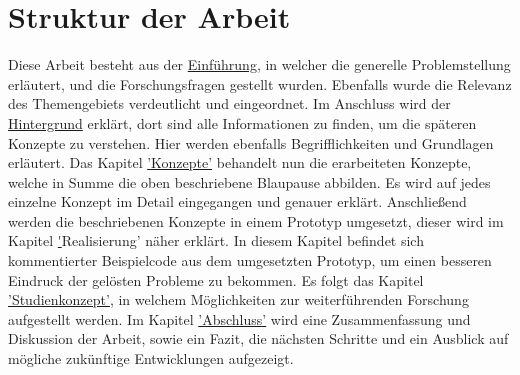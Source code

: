 \section{Struktur der Arbeit}

Diese Arbeit besteht aus der \hyperref[sec:einfuehrung]{Einführung}, in welcher die generelle Problemstellung erläutert, und die Forschungsfragen gestellt wurden. Ebenfalls wurde die Relevanz des Themengebiets verdeutlicht und eingeordnet. Im Anschluss wird der \hyperref[sec:hintergrund]{Hintergrund} erklärt, dort sind alle Informationen zu finden, um die späteren Konzepte zu verstehen. Hier werden ebenfalls Begrifflichkeiten und Grundlagen erläutert. Das Kapitel \hyperref[sec:konzepte]{'Konzepte'} behandelt nun die erarbeiteten Konzepte, welche in Summe die oben beschriebene Blaupause abbilden. Es wird auf jedes einzelne Konzept im Detail eingegangen und genauer erklärt. Anschließend werden die beschriebenen Konzepte in einem Prototyp umgesetzt, dieser wird im Kapitel \hyperref[sec:realisierung]'{Realisierung'} näher erklärt. In diesem Kapitel befindet sich kommentierter Beispielcode aus dem umgesetzten Prototyp, um einen besseren Eindruck der gelösten Probleme zu bekommen. Es folgt das Kapitel \hyperref[studienkonzept]{'Studienkonzept'}, in welchem Möglichkeiten zur weiterführenden Forschung aufgestellt werden. Im Kapitel \hyperref[sec:abschluss]{'Abschluss'} wird eine Zusammenfassung und Diskussion der Arbeit, sowie ein Fazit, die nächsten Schritte und ein Ausblick auf mögliche zukünftige Entwicklungen aufgezeigt.
